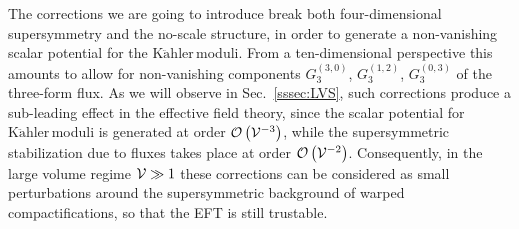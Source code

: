 \documentclass[12pt,a4paper]{book}
\newcommand{\Kahler}{\ensuremath{\text{K}\ddot{\text{a}}\text{hler}\,}}
\newcommand{\V}{{\cal{V}}}
\begin{document}
The corrections we are going to introduce break both four-dimensional supersymmetry and the no-scale structure, in order to generate a non-vanishing scalar potential for the \Kahler moduli. From a ten-dimensional perspective this amounts to allow for non-vanishing components $G_{3}^{(3,0)}$, $G_3^{(1,2)}$, $G_3^{(0,3)}$ of the three-form flux. As we will observe in Sec.~\ref{sssec:LVS}, such corrections produce a sub-leading effect in the effective field theory, since the scalar potential for \Kahler moduli is generated at order $\mathcal{O}\left(\V^{-3}\right)$, while the supersymmetric stabilization due to fluxes takes place at order $\mathcal{O}\left(\V^{-2}\right)$. Consequently, in the large volume regime $\V \gg 1$ these corrections can be considered as small perturbations around the supersymmetric background of warped compactifications, so that the EFT is still trustable.
\end{document}
